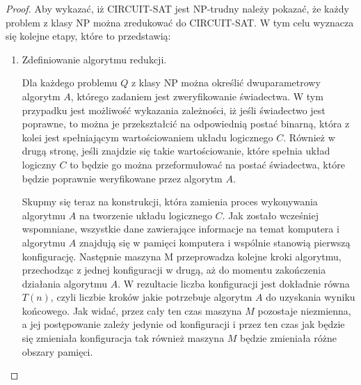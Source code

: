 \begin{proof}
Aby wykazać, iż CIRCUIT-SAT jest NP-trudny należy pokazać, że każdy problem z klasy NP można zredukować do CIRCUIT-SAT. W tym celu wyznacza się kolejne etapy, które to przedstawią:


\begin{enumerate}
\item Zdefiniowanie algorytmu redukcji.

Dla każdego problemu $Q$ z klasy NP można określić dwuparametrowy algorytm $A$, którego zadaniem jest zweryfikowanie świadectwa. W tym przypadku jest możliwość wykazania zależności, iż jeśli świadectwo jest poprawne, to można je przekształcić na odpowiednią postać binarną, która z kolei jest spełniającym wartościowaniem układu logicznego $C$. Również w drugą stronę, jeśli znajdzie się takie wartościowanie, które spełnia układ logiczny $C$ to będzie go można przeformułować na postać świadectwa, które będzie poprawnie weryfikowane przez algorytm $A$.

Skupmy się teraz na konstrukcji, która zamienia proces wykonywania algorytmu $A$ na tworzenie układu logicznego $C$. Jak zostało wcześniej wspomniane, wszystkie dane zawierające informacje na temat komputera i algorytmu $A$ znajdują się w pamięci komputera i wspólnie stanowią pierwszą konfigurację. Następnie maszyna M przeprowadza kolejne kroki algorytmu, przechodząc z jednej konfiguracji w drugą, aż do momentu zakończenia działania algorytmu $A$. W rezultacie liczba konfiguracji jest dokładnie równa $T(n)$, czyli liczbie kroków jakie potrzebuje algorytm $A$ do uzyskania wyniku końcowego. Jak widać, przez cały ten czas maszyna $M$ pozostaje niezmienna, a jej postępowanie zależy jedynie od konfiguracji i przez ten czas jak będzie się zmieniała konfiguracja tak również maszyna $M$ będzie zmieniała różne obszary pamięci.
	

\end{enumerate}
\end{proof}
